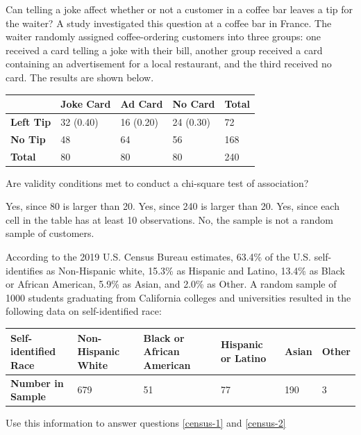 \documentclass{article}
\begin{document}
\begin{mcquestions}
		
		\question Can telling a joke affect whether or not a customer in a coffee bar leaves a tip for the waiter? A study investigated this question at a coffee bar in France. The waiter randomly assigned coffee-ordering customers into three groups: one received a card telling a joke with their bill, another group received a card containing an advertisement for a local restaurant, and the third received no card. The results are shown below.
		\begin{center}
			\begin{tabular}{| l | l | l | l | l |}
				\hline
				& \textbf{Joke Card} & \textbf{Ad Card} & \textbf{No Card} & \textbf{Total} \\
				\hline
				\textbf{Left Tip} & 32 (0.40) & 16 (0.20) & 24 (0.30) & 72 \\
				\hline
				\textbf{No Tip} & 48 & 64 & 56 & 168 \\
				\hline
				\textbf{Total} & 80 & 80 & 80 & 240 \\
				\hline
			\end{tabular}
		\end{center}
		Are validity conditions met to conduct a chi-square test of association?
		\begin{mcanswerslist}
			\answer Yes, since 80 is larger than 20.
			\answer Yes, since 240 is larger than 20.
			\answer[correct] Yes, since each cell in the table has at least 10 observations.
			\answer No, the sample is not a random sample of customers.
		\end{mcanswerslist}
		
		\begin{mcquestioninstruction}
			According to the 2019 U.S. Census Bureau estimates, 63.4\% of the U.S. self-identifies as Non-Hispanic white, 15.3\% as Hispanic and Latino, 13.4\% as Black or African American, 5.9\% as Asian, and 2.0\% as Other. A random sample of 1000 students graduating from California colleges and universities resulted in the following data on self-identified race:
			\begin{center}
				\begin{tabular}{| p{1in} | p{1in} | p{1in} | p{1in} | p{1in} | p{1in} |}
					\hline
					\textbf{Self-identified Race} & Non-Hispanic White & Black or African American & Hispanic or Latino & Asian & Other \\
					\hline
					\textbf{Number in Sample} & 679 & 51 & 77 & 190 & 3 \\
					\hline
				\end{tabular}
			\end{center}
			Use this information to answer questions \ref{census-1} and \ref{census-2}
		\end{mcquestioninstruction}
		

\end{mcquestions}
\end{document}
